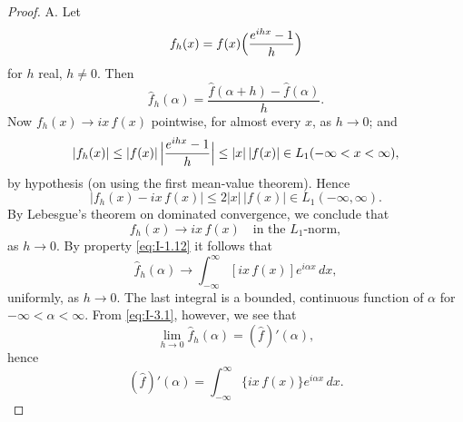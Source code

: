 \begin{proof}
\textup{A.} Let
\begin{equation*}
f_h(x)=f(x)\Bigl(\frac{e^{ihx}-1}{h}\Bigr)
\end{equation*}
for $h$ real, $h\neq 0$. Then
\begin{equation}\label{eq:I-3.1}
\widehat f_h(\alpha)=\frac{\hat f(\alpha+h)-\hat f(\alpha)}{h}.
\end{equation}
Now $f_h(x)\to ix\,f(x)$ pointwise, for almost every $x$, as $h\to 0$; and
\begin{equation*}
|f_h(x)|\le|f(x)|\,\Bigl|\frac{e^{ihx}-1}{h}\Bigr|
\le|x|\,|f(x)|\in L_1(-\infty<x<\infty),
\end{equation*}
by hypothesis (on using the first mean-value theorem). Hence
\begin{equation*}
|f_h(x)-ix\,f(x)|\le 2|x|\,|f(x)|\in L_1(-\infty,\infty).
\end{equation*}
By Lebesgue's theorem on dominated convergence, we conclude that
\begin{equation*}
f_h(x)\to ix\,f(x)\quad\text{in the }L_1\text{-norm},
\end{equation*}
as $h\to 0$. By property \eqref{eq:I-1.12} it follows that
\begin{equation}\label{eq:I-3.2}
\hat f_h(\alpha)\to\int_{-\infty}^{\infty}[ix\,f(x)]e^{i\alpha x}\,dx,
\end{equation}
uniformly, as $h\to 0$. The last integral is a bounded, continuous function of $\alpha$ for $-\infty<\alpha<\infty$. From \eqref{eq:I-3.1}, however, we see that
\begin{equation*}
\lim_{h\to 0}\hat f_h(\alpha)=(\hat f)'(\alpha),
\end{equation*}
hence
\begin{equation*}
(\hat f)'(\alpha)=\int_{-\infty}^{\infty}\{ix\,f(x)\}e^{i\alpha x}\,dx.
\end{equation*}


\end{proof}
